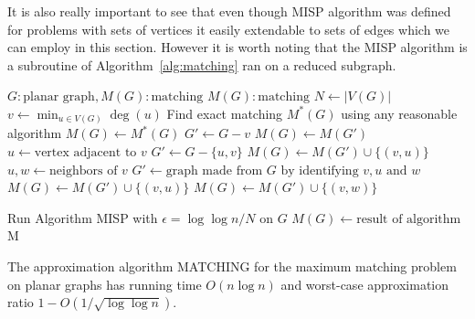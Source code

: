 It is also really important to see
that even though \textsc{MISP} algorithm was defined for problems with sets of vertices
it easily extendable to sets of edges which we can employ in this section. 
However it is worth noting that the \textsc{MISP} algorithm is a subroutine of 
Algorithm~\ref{alg:matching} ran on a reduced subgraph.

\begin{algorithm}[htbp]
\caption{\textsc{MATCHING} procedure}
\label{alg:matching}
\begin{algorithmic}[1]
    \Require $G \colon \text{planar graph}, M(G) \colon \text{matching}$
    \Ensure $M(G) \colon \text{matching}$
    \State $N \gets |V(G)|$
    \State $v \gets \min_{u \in V(G)} \deg(u)$
        \State Find exact matching $M^*(G)$ using any reasonable algorithm
        \State $M(G) \gets M^*(G)$
            \State $G' \gets G - v$
            \State {}
            \State $M(G) \gets M(G')$
            \State $u \gets \text{vertex adjacent to } v$
            \State $G' \gets G - \{u, v\}$
            \State {}
            \State $M(G) \gets M(G') \cup \{ (v, u) \}$
            \State $u, w \gets \text{neighbors of } v$
            \State $G' \gets \text{graph made from } G \text{ by identifying }
            v, u \text{ and } w$
            \State {}
                \State $M(G) \gets M(G') \cup \{(v, u)\}$
            \Else
                \State $M(G) \gets M(G') \cup \{(v, w)\}$
            \EndIf
        \EndIf

    \Else
    \State Run Algorithm \textsc{MISP} with $\epsilon =
        {\log\log n}/N$ on $G$
        \State $M(G) \gets \text{result of algorithm}$
    \EndIf
    \State \Return M
\end{algorithmic}
\end{algorithm}

\begin{theorem}\label{thm:matching}
    The approximation algorithm \textsc{MATCHING} for the maximum matching problem on
    planar graphs has running time $O(n \log n)$ and worst-case approximation ratio
    $1 - O(1/\sqrt{\log \log n}) $.
\end{theorem}

